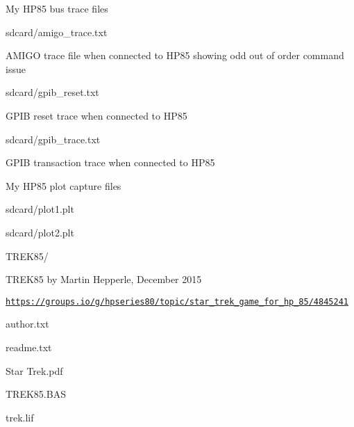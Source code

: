 \begin{DoxyPre}
\begin{DoxyItemize}
\begin{DoxyItemize}
\begin{DoxyItemize}
\begin{DoxyItemize}
\end{DoxyItemize}
\end{DoxyItemize}
\item My HP85 bus trace files
\begin{DoxyItemize}
\item sdcard/amigo\_trace.txt
\begin{DoxyItemize}
\item AMIGO trace file when connected to HP85 showing odd out of order command issue
\end{DoxyItemize}
\item sdcard/gpib\_reset.txt
\begin{DoxyItemize}
\item GPIB reset trace when connected to HP85
\end{DoxyItemize}
\item sdcard/gpib\_trace.txt
\begin{DoxyItemize}
\item GPIB transaction trace when connected to HP85
\end{DoxyItemize}
\end{DoxyItemize}
\item My HP85 plot capture files
\begin{DoxyItemize}
\item sdcard/plot1.plt
\item sdcard/plot2.plt
\end{DoxyItemize}
\item TREK85/
\begin{DoxyItemize}
\item TREK85 by Martin Hepperle, December 2015
\item \href{https://groups.io/g/hpseries80/topic/star_trek_game_for_hp_85/4845241}{\tt https://groups.io/g/hpseries80/topic/star\_trek\_game\_for\_hp\_85/4845241}
\begin{DoxyItemize}
\item author.txt
\item readme.txt
\item Star Trek.pdf
\item TREK85.BAS
\item trek.lif

\end{DoxyItemize}
\end{DoxyItemize}
\end{DoxyItemize}
\end{DoxyItemize}\end{DoxyPre}
